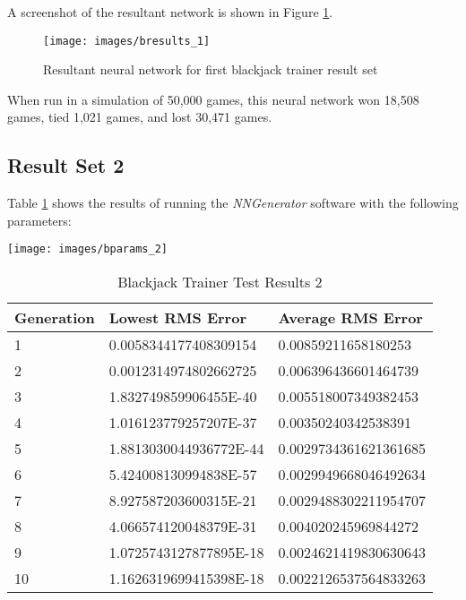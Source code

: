 A screenshot of the resultant network is shown in Figure \ref{bresults_1}.

\begin{figure}[h!]
  \centering
  \texttt{[image: images/bresults\_1]}
  \caption{Resultant neural network for first blackjack trainer result set}
  \label{bresults_1}
\end{figure}

When run in a simulation of 50,000 games, this neural network won 18,508
games, tied 1,021 games, and lost 30,471 games.

\subsection{Result Set 2}
Table \ref{btr2} shows the results of running the {\it NNGenerator} software with the following parameters:

\begin{center}
\texttt{[image: images/bparams\_2]}
\end{center}

\begin{center}
    \begin{longtable}{ | l | l | l |}
      \caption{Blackjack Trainer Test Results 2} \label{btr2} \\
   \hline
  Generation & Lowest RMS Error & Average RMS Error \\ \hline
1 &	0.0058344177408309154 &	0.00859211658180253 \\ \hline
2 &	0.0012314974802662725 &	0.006396436601464739 \\ \hline
3 &	1.832749859906455E-40 &	0.005518007349382453 \\ \hline
4 &	1.016123779257207E-37 &	0.00350240342538391 \\ \hline
5 &	1.8813030044936772E-44 &	0.0029734361621361685 \\ \hline
6 &	5.424008130994838E-57 &	0.0029949668046492634 \\ \hline
7 &	8.927587203600315E-21 &	0.0029488302211954707 \\ \hline
8 &	4.066574120048379E-31 &	0.004020245969844272 \\ \hline
9 &	1.0725743127877895E-18 &	0.0024621419830630643 \\ \hline
10 &	1.1626319699415398E-18 &	0.0022126537564833263 \\ \hline
\end{longtable}
\end{center}

